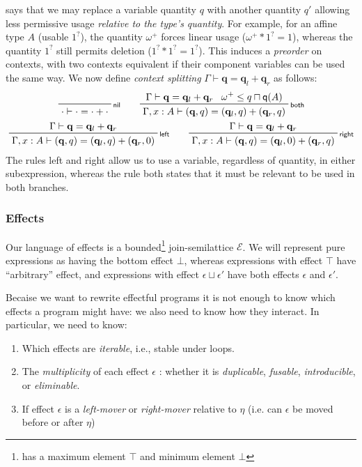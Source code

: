 \documentclass[acmsmall,screen,anonymous,review]{acmart}
\newcommand{\mc}[1]{\ensuremath{\mathcal{#1}}}
\newcommand{\mb}[1]{\ensuremath{\mathbf{#1}}}
\newcommand{\ms}[1]{\ensuremath{\mathsf{#1}}}
\newcommand{\qsp}[4]{#1 \vdash #2 = #3 + #4}
\newcommand{\rle}[1]{{\scriptsize\textsf{#1}}}
\newcommand{\brle}[1]{{\textsf{#1}}}
\newcommand{\zeroq}{0}
\newcommand{\delq}{1^?}
\newcommand{\cpyq}{\omega^+}
\newcommand{\alquant}{\ms{q}}
\begin{document}
says that we may replace a variable quantity $q$ with another quantity $q'$ allowing
less permissive usage \emph{relative to the type's quantity}. For example, for an affine
type $A$ (usable $\delq$), the quantity $\cpyq$ forces linear usage ($\cpyq \ast \delq = 1$), whereas
the quantity $\delq$ still permits deletion ($\delq \ast \delq = \delq$). This induces a \emph{preorder} on
contexts, with two contexts equivalent if their component variables can be used the same way.
%
We now  define \emph{context splitting} $\qsp{\Gamma}{\mb{q}}{\mb{q}_l}{\mb{q}_r}$ as
follows:
\begin{gather*}
  \prftree[r]{\rle{nil}}
    {\qsp{\cdot}{\cdot}{\cdot}{\cdot}} \qquad
  \prftree[r]{\rle{both}}
    {\qsp{\Gamma}{\mb{q}}{\mb{q}_l}{\mb{q}_r}}
    {\cpyq \leq q \sqcap \alquant(A)}
    {\qsp{\Gamma, x : A}{(\mb{q}, q)}{(\mb{q}_l, q)}{(\mb{q}_r, q)}}
    \\
  \prftree[r]{\rle{left}}
    {\qsp{\Gamma}{\mb{q}}{\mb{q}_l}{\mb{q}_r}}
    {\qsp{\Gamma, x : A}{(\mb{q}, q)}{(\mb{q}_l, q)}{(\mb{q}_r, \zeroq)}} \qquad
  \prftree[r]{\rle{right}}
    {\qsp{\Gamma}{\mb{q}}{\mb{q}_l}{\mb{q}_r}}
    {\qsp{\Gamma, x : A}{(\mb{q}, q)}{(\mb{q}_l, \zeroq)}{(\mb{q}_r, q)}}
\end{gather*}
The rules \brle{left} and \brle{right} allow us to use a variable, regardless of quantity, in either
subexpression, whereas the rule \brle{both} states that it must be relevant to be used in both branches.

\subsubsection{Effects}
Our language of effects is a bounded\footnote{has a maximum element $\top$ and minimum element
$\bot$} join-semilattice $\mc{E}$. We will represent pure expressions as having the bottom effect
$\bot$, whereas expressions with effect $\top$ have ``arbitrary'' effect, and expressions with
effect $\epsilon \sqcup \epsilon'$ have both effects $\epsilon$ and $\epsilon'$.

Becaise we want to rewrite effectful programs it is not
enough to know which effects a program might have: we also need to know how they
interact. In particular, we need to know:
\begin{enumerate}
  \item Which effects are \emph{iterable}, i.e., stable under loops. 
  \item The \emph{multiplicity} of each effect $\epsilon$ : whether it
  is \emph{duplicable}, \emph{fusable}, \emph{introducible}, or \emph{eliminable}.
  \item If effect $\epsilon$ is a \emph{left-mover} or \emph{right-mover} relative to $\eta$  (i.e. can $\epsilon$ be moved before or after $\eta$) 
\end{enumerate}
\end{document}
